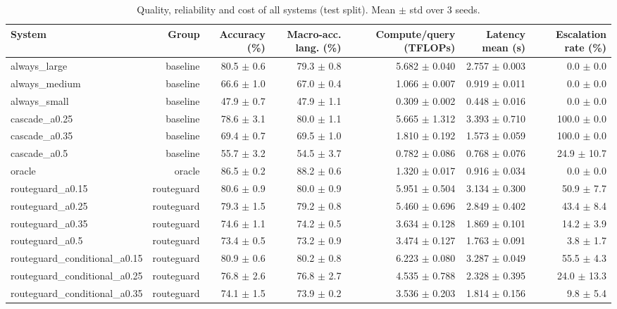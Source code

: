 \begin{table}[t]
\centering
\small
\caption{Quality, reliability and cost of all systems (test split). Mean $\pm$ std over 3 seeds.}
\label{tab:main_results}
\begin{tabular}{lrrrrrr}
\toprule
System & Group & Accuracy (\%) & Macro-acc. lang. (\%) & Compute/query (TFLOPs) & Latency mean (s) & Escalation rate (\%) \\
\midrule
always\_large & baseline & 80.5 $\pm$ 0.6 & 79.3 $\pm$ 0.8 & 5.682 $\pm$ 0.040 & 2.757 $\pm$ 0.003 & 0.0 $\pm$ 0.0 \\
always\_medium & baseline & 66.6 $\pm$ 1.0 & 67.0 $\pm$ 0.4 & 1.066 $\pm$ 0.007 & 0.919 $\pm$ 0.011 & 0.0 $\pm$ 0.0 \\
always\_small & baseline & 47.9 $\pm$ 0.7 & 47.9 $\pm$ 1.1 & 0.309 $\pm$ 0.002 & 0.448 $\pm$ 0.016 & 0.0 $\pm$ 0.0 \\
cascade\_a0.25 & baseline & 78.6 $\pm$ 3.1 & 80.0 $\pm$ 1.1 & 5.665 $\pm$ 1.312 & 3.393 $\pm$ 0.710 & 100.0 $\pm$ 0.0 \\
cascade\_a0.35 & baseline & 69.4 $\pm$ 0.7 & 69.5 $\pm$ 1.0 & 1.810 $\pm$ 0.192 & 1.573 $\pm$ 0.059 & 100.0 $\pm$ 0.0 \\
cascade\_a0.5 & baseline & 55.7 $\pm$ 3.2 & 54.5 $\pm$ 3.7 & 0.782 $\pm$ 0.086 & 0.768 $\pm$ 0.076 & 24.9 $\pm$ 10.7 \\
oracle & oracle & 86.5 $\pm$ 0.2 & 88.2 $\pm$ 0.6 & 1.320 $\pm$ 0.017 & 0.916 $\pm$ 0.034 & 0.0 $\pm$ 0.0 \\
routeguard\_a0.15 & routeguard & 80.6 $\pm$ 0.9 & 80.0 $\pm$ 0.9 & 5.951 $\pm$ 0.504 & 3.134 $\pm$ 0.300 & 50.9 $\pm$ 7.7 \\
routeguard\_a0.25 & routeguard & 79.3 $\pm$ 1.5 & 79.2 $\pm$ 0.8 & 5.460 $\pm$ 0.696 & 2.849 $\pm$ 0.402 & 43.4 $\pm$ 8.4 \\
routeguard\_a0.35 & routeguard & 74.6 $\pm$ 1.1 & 74.2 $\pm$ 0.5 & 3.634 $\pm$ 0.128 & 1.869 $\pm$ 0.101 & 14.2 $\pm$ 3.9 \\
routeguard\_a0.5 & routeguard & 73.4 $\pm$ 0.5 & 73.2 $\pm$ 0.9 & 3.474 $\pm$ 0.127 & 1.763 $\pm$ 0.091 & 3.8 $\pm$ 1.7 \\
routeguard\_conditional\_a0.15 & routeguard & 80.9 $\pm$ 0.6 & 80.2 $\pm$ 0.8 & 6.223 $\pm$ 0.080 & 3.287 $\pm$ 0.049 & 55.5 $\pm$ 4.3 \\
routeguard\_conditional\_a0.25 & routeguard & 76.8 $\pm$ 2.6 & 76.8 $\pm$ 2.7 & 4.535 $\pm$ 0.788 & 2.328 $\pm$ 0.395 & 24.0 $\pm$ 13.3 \\
routeguard\_conditional\_a0.35 & routeguard & 74.1 $\pm$ 1.5 & 73.9 $\pm$ 0.2 & 3.536 $\pm$ 0.203 & 1.814 $\pm$ 0.156 & 9.8 $\pm$ 5.4 \\
\bottomrule
\end{tabular}
\end{table}
